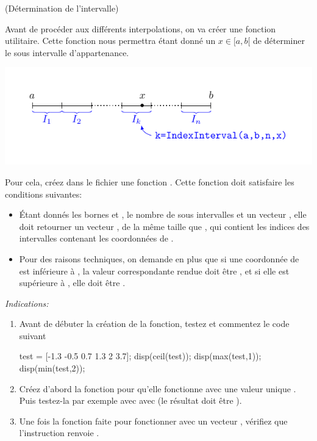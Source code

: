 \documentclass[a4paper,12pt,reqno]{amsart}
\begin{document}
\setcounter{numeroexo}{-1} %
\begin{exo} (Détermination de l'intervalle)

  Avant de procéder aux différents interpolations, on va créer une fonction utilitaire. Cette fonction nous permettra étant donné un $x \in [a,b[$ de déterminer le sous intervalle d'appartenance.

\begin{center}
  \includegraphics[width=15cm]{IndexInterval}
\end{center}

  Pour cela, créez dans le fichier  une fonction . Cette fonction doit satisfaire les conditions suivantes:
  \begin{itemize}
    \item Étant donnés les bornes  et , le nombre de sous intervalles  et un vecteur , elle doit retourner un vecteur , de la même taille que , qui contient les indices des intervalles contenant les coordonnées de .

    \item Pour des raisons techniques, on demande en plus que si une coordonnée de  est inférieure à , la valeur correspondante rendue doit être , et si elle est supérieure à , elle doit être .
  \end{itemize}

  \textit{Indications:}
  \begin{enumerate}
    \item Avant de débuter la création de la fonction, testez et commentez le code suivant
    \begin{matlab}
      test = [-1.3 -0.5 0.7 1.3 2 3.7];
      disp(ceil(test));
      disp(max(test,1));
      disp(min(test,2));
    \end{matlab}

    \item Créez d'abord la fonction pour qu'elle fonctionne avec une valeur unique . Puis testez-la par exemple avec avec  (le résultat doit être ).

    \item Une fois la fonction faite pour fonctionner avec un vecteur , vérifiez que l'instruction  renvoie .
  \end{enumerate}

\end{exo}
\end{document}

